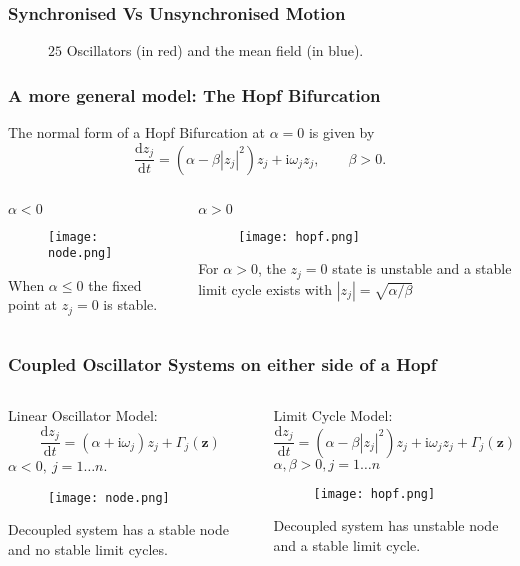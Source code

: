 \documentclass[10pt,reqno]{beamer}
\newcommand{\D}[2]{\frac{\mathrm{d} #1}{\mathrm{d} #2}}
\newcommand{\I}{\mathrm{i}}
\begin{document}
\begin{frame}
\frametitle{Synchronised Vs Unsynchronised Motion}
\begin{figure}
	\caption{$25$ Oscillators (in red) and the mean field (in blue).}
\end{figure}
\end{frame}
\begin{frame}
\frametitle{A more general model: The Hopf Bifurcation}
The normal form of a Hopf Bifurcation at $\alpha = 0$ is given by
\[
\D{z_j}{t}= (\alpha - \beta|z_j|^2)z_j + \I\omega_j z_j, \qquad \beta >0.
\]
\begin{columns}[t]
\begin{column}{.49\textwidth}
\centering
$\alpha <0$
\begin{figure}
	\texttt{[image: node.png]}
\end{figure}
When $\alpha \le 0$ the fixed point at $z_j =0$ is stable.
\end{column}
\begin{column}{.49\textwidth}
\centering
$\alpha >0$
\begin{figure}
	\texttt{[image: hopf.png]}
\end{figure}
For $\alpha>0$, the $z_j=0$ state is unstable and a stable limit cycle exists with $|z_j| = \sqrt{\alpha/\beta}$				
\end{column}
\end{columns}
\end{frame}
\begin{frame}
\frametitle{Coupled Oscillator Systems on either side of a Hopf}
\begin{columns}[t]
\begin{column}{.49\textwidth}
\centering
Linear Oscillator Model:
\[
\D{z_j}{t} = (\alpha +\I\omega_j)z_j+\Gamma_j(\mathbf{z})
\]
$\alpha <0,\ j = 1\dots n$.
\begin{figure}
	\texttt{[image: node.png]}
\end{figure}
Decoupled system has a stable node and no stable limit cycles.
\end{column}
\begin{column}{.49\textwidth}
\centering
Limit Cycle Model:
\[
\D{z_j}{t} = (\alpha - \beta|z_j|^2)z_j + \I\omega_jz_j +\Gamma_j(\mathbf{z})
\]
$\alpha,\beta>0, j = 1\dots n$
\begin{figure}
	\texttt{[image: hopf.png]}
\end{figure}
Decoupled system has unstable node and a stable limit cycle.
\end{column}
\end{columns}
\end{frame}
\end{document}
